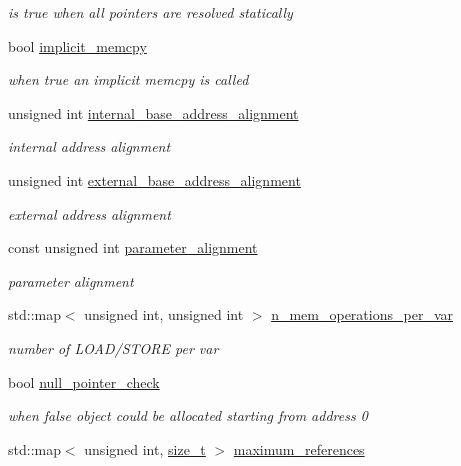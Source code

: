 \begin{DoxyCompactItemize}
\begin{DoxyCompactList}\small\item\em is true when all pointers are resolved statically \end{DoxyCompactList}\item 
bool \hyperlink{classmemory_a86949b9eb85aded9563911074a16f691}{implicit\+\_\+memcpy}
\begin{DoxyCompactList}\small\item\em when true an implicit memcpy is called \end{DoxyCompactList}\item 
unsigned int \hyperlink{classmemory_aae0423a2b0d67d6144694b6b41025141}{internal\+\_\+base\+\_\+address\+\_\+alignment}
\begin{DoxyCompactList}\small\item\em internal address alignment \end{DoxyCompactList}\item 
unsigned int \hyperlink{classmemory_a6e43571c74b6e7627406a0f0b14e7756}{external\+\_\+base\+\_\+address\+\_\+alignment}
\begin{DoxyCompactList}\small\item\em external address alignment \end{DoxyCompactList}\item 
const unsigned int \hyperlink{classmemory_ac5e94e5f126f12d204d58d96384124f6}{parameter\+\_\+alignment}
\begin{DoxyCompactList}\small\item\em parameter alignment \end{DoxyCompactList}\item 
std\+::map$<$ unsigned int, unsigned int $>$ \hyperlink{classmemory_ace0b7da6929aa5fb0a72f099e72eb0da}{n\+\_\+mem\+\_\+operations\+\_\+per\+\_\+var}
\begin{DoxyCompactList}\small\item\em number of L\+O\+A\+D/\+S\+T\+O\+RE per var \end{DoxyCompactList}\item 
bool \hyperlink{classmemory_af76a7dbf11a240c8f8664444295701aa}{null\+\_\+pointer\+\_\+check}
\begin{DoxyCompactList}\small\item\em when false object could be allocated starting from address 0 \end{DoxyCompactList}\item 
std\+::map$<$ unsigned int, \hyperlink{tutorial__fpt__2017_2intro_2sixth_2test_8c_a7c94ea6f8948649f8d181ae55911eeaf}{size\+\_\+t} $>$ \hyperlink{classmemory_a268547b20b11daccd5d48b340c435915}{maximum\+\_\+references}

\end{DoxyCompactItemize}
